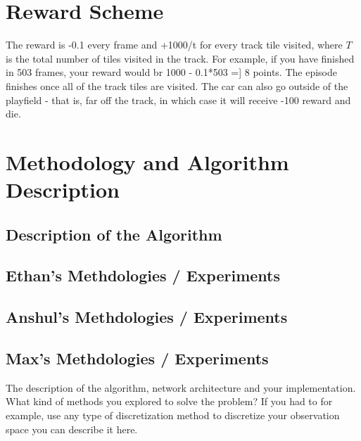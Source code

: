 \documentclass{article}
\begin{document}
\section{Reward Scheme}

The reward is -0.1 every frame and +1000/t for every track tile visited, where $T$ is the total number of tiles visited in the track. For example, if you have finished in 503 frames, your reward would br 1000 - 0.1*503 =] 8 points. The episode finishes once all of the track tiles are visited. The car can also go outside of the playfield - that is, far off the track, in which case it will receive -100 reward and die.


\section{Methodology and Algorithm Description} 


\subsection{Description of the Algorithm}


\subsection{Ethan's Methdologies / Experiments}


\subsection{Anshul's Methdologies / Experiments}


\subsection{Max's Methdologies / Experiments}

The description of the algorithm, network architecture and your implementation. What kind of methods you explored to solve the problem? If you had to for example, use any type of discretization method to discretize your observation space you can describe it here.
\end{document}
